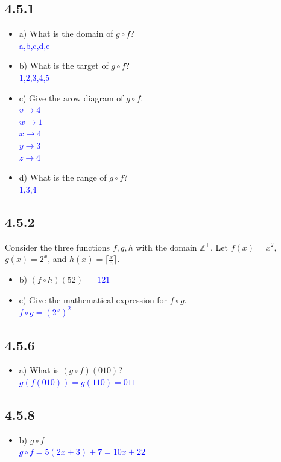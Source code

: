 \documentclass{article}
\begin{document}
\subsection*{4.5.1}
\begin{itemize}
    \item a) What is the domain of $g \circ f$? \\
    \textcolor{blue}{a,b,c,d,e}
    \item b) What is the target of $g \circ f$? \\
    \textcolor{blue}{1,2,3,4,5}
    \item c) Give the arow diagram of $g \circ f$. \\
    \textcolor{blue}{$v \rightarrow 4$} \\
    \textcolor{blue}{$w \rightarrow 1$} \\
    \textcolor{blue}{$x \rightarrow 4$} \\
    \textcolor{blue}{$y \rightarrow 3$} \\
    \textcolor{blue}{$z \rightarrow 4$}
    \item d) What is the range of $g \circ f$? \\
    \textcolor{blue}{1,3,4}
\end{itemize}

\subsection*{4.5.2}
Consider the three functions $f,g,h$ with the domain $\mathbb{Z}^+$. Let $f(x) = x^2$, $g(x) = 2^x$, and $h(x) = \lceil \frac{x}{5} \rceil$.
\begin{itemize}
    \item b) $(f \circ h)(52) = $ \textcolor{blue}{$121$}
    \item e) Give the mathematical expression for $f \circ g$. \\
    \textcolor{blue}{$f \circ g = (2^x)^2$}
\end{itemize}

\subsection*{4.5.6}
\begin{itemize}
    \item a) What is $(g \circ f)(010)$? \\
    \textcolor{blue}{$g(f(010)) = g(110) = 011$}
\end{itemize}

\subsection*{4.5.8}
\begin{itemize}
    \item b) $g \circ f$ \\
    \textcolor{blue}{$g \circ f = 5(2x + 3) + 7 = 10x + 22$}
\end{itemize}
\end{document}
